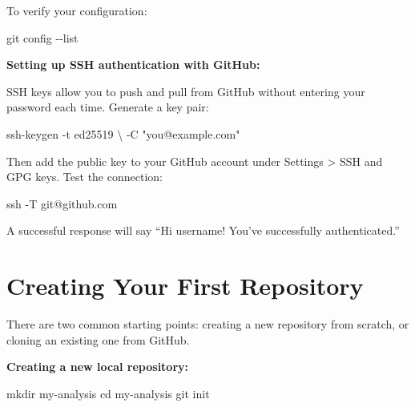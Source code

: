 \documentclass[
  letterpaper,
  DIV=11,
  numbers=noendperiod]{scrartcl}
\newenvironment{Shaded}{\begin{snugshade}}{\end{snugshade}}
\newcommand{\AttributeTok}[1]{\textcolor[rgb]{0.40,0.45,0.13}{#1}}
\newcommand{\BuiltInTok}[1]{\textcolor[rgb]{0.00,0.23,0.31}{#1}}
\newcommand{\DataTypeTok}[1]{\textcolor[rgb]{0.68,0.00,0.00}{#1}}
\newcommand{\FunctionTok}[1]{\textcolor[rgb]{0.28,0.35,0.67}{#1}}
\newcommand{\NormalTok}[1]{\textcolor[rgb]{0.00,0.23,0.31}{#1}}
\newcommand{\StringTok}[1]{\textcolor[rgb]{0.13,0.47,0.30}{#1}}
\begin{document}
To verify your configuration:

\begin{Shaded}
\begin{Highlighting}[]
\FunctionTok{git}\NormalTok{ config }\AttributeTok{{-}{-}list}
\end{Highlighting}
\end{Shaded}

\textbf{Setting up SSH authentication with GitHub:}

SSH keys allow you to push and pull from GitHub without entering your
password each time. Generate a key pair:

\begin{Shaded}
\begin{Highlighting}[]
\FunctionTok{ssh{-}keygen} \AttributeTok{{-}t}\NormalTok{ ed25519 }\DataTypeTok{\textbackslash{}}
  \AttributeTok{{-}C} \StringTok{"you@example.com"}
\end{Highlighting}
\end{Shaded}

Then add the public key to your GitHub account under Settings
\textgreater{} SSH and GPG keys. Test the connection:

\begin{Shaded}
\begin{Highlighting}[]
\FunctionTok{ssh} \AttributeTok{{-}T}\NormalTok{ git@github.com}
\end{Highlighting}
\end{Shaded}

A successful response will say ``Hi username! You've successfully
authenticated.''

\section{Creating Your First
Repository}\label{creating-your-first-repository}

There are two common starting points: creating a new repository from
scratch, or cloning an existing one from GitHub.

\textbf{Creating a new local repository:}

\begin{Shaded}
\begin{Highlighting}[]
\FunctionTok{mkdir}\NormalTok{ my{-}analysis}
\BuiltInTok{cd}\NormalTok{ my{-}analysis}
\FunctionTok{git}\NormalTok{ init}
\end{Highlighting}
\end{Shaded}
\end{document}
